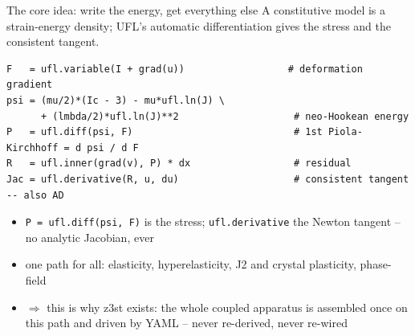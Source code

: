 \documentclass[aspectratio=169,11pt]{beamer}
\begin{document}
\begin{frame}[fragile]{The core idea: write the energy, get everything else}
  A constitutive model is a \alert{strain-energy density}; UFL's automatic
  differentiation gives the stress and the consistent tangent.
  \vspace{0.2em}
  \begin{lstlisting}
F   = ufl.variable(I + grad(u))                  # deformation gradient
psi = (mu/2)*(Ic - 3) - mu*ufl.ln(J) \
      + (lmbda/2)*ufl.ln(J)**2                    # neo-Hookean energy
P   = ufl.diff(psi, F)                            # 1st Piola-Kirchhoff = d psi / d F
R   = ufl.inner(grad(v), P) * dx                  # residual
Jac = ufl.derivative(R, u, du)                    # consistent tangent -- also AD
  \end{lstlisting}
  \begin{itemize}
    \item \texttt{P = ufl.diff(psi, F)} is the stress; \texttt{ufl.derivative} the Newton tangent -- no analytic Jacobian, ever
    \item one path for all: elasticity, hyperelasticity, J2 \alert{and crystal} plasticity, phase-field
    \item \alert{$\Rightarrow$ this is why z3st exists:} the \alert{whole coupled apparatus} is assembled once on this path and driven by YAML -- never re-derived, never re-wired
  \end{itemize}
\end{frame}
\end{document}
